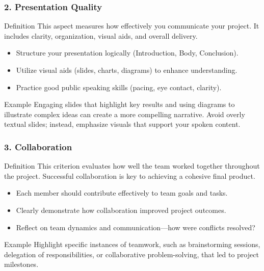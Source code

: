 \documentclass[aspectratio=169]{beamer}
\begin{document}
\begin{frame}[fragile]
    \frametitle{2. Presentation Quality}
    
    \begin{block}{Definition}
        This aspect measures how effectively you communicate your project. It includes clarity, organization, visual aids, and overall delivery.
    \end{block}
    
    \begin{itemize}
        \item Structure your presentation logically (Introduction, Body, Conclusion).
        \item Utilize visual aids (slides, charts, diagrams) to enhance understanding.
        \item Practice good public speaking skills (pacing, eye contact, clarity).
    \end{itemize}
    
    \begin{exampleblock}{Example}
        Engaging slides that highlight key results and using diagrams to illustrate complex ideas can create a more compelling narrative. Avoid overly textual slides; instead, emphasize visuals that support your spoken content.
    \end{exampleblock}
\end{frame}

\begin{frame}[fragile]
    \frametitle{3. Collaboration}
    
    \begin{block}{Definition}
        This criterion evaluates how well the team worked together throughout the project. Successful collaboration is key to achieving a cohesive final product.
    \end{block}
    
    \begin{itemize}
        \item Each member should contribute effectively to team goals and tasks.
        \item Clearly demonstrate how collaboration improved project outcomes.
        \item Reflect on team dynamics and communication—how were conflicts resolved?
    \end{itemize}
    
    \begin{exampleblock}{Example}
        Highlight specific instances of teamwork, such as brainstorming sessions, delegation of responsibilities, or collaborative problem-solving, that led to project milestones.
    \end{exampleblock}
\end{frame}
\end{document}

